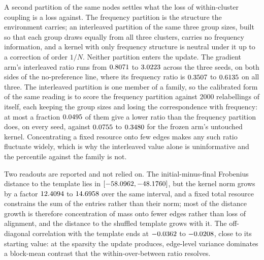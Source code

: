 \documentclass{article}
\begin{document}
A second partition of the same nodes settles what the loss of within-cluster
coupling is a loss against. The frequency partition is the structure the
environment carries; an interleaved partition of the same three group sizes,
built so that each group draws equally from all three clusters, carries no
frequency information, and a kernel with only frequency structure is neutral
under it up to a correction of order $1/N$. Neither partition enters the update.
The gradient arm's interleaved ratio runs from $0.8071$ to
$3.0223$ across the three seeds, on both sides of the
no-preference line, where its frequency ratio is $0.3507$ to
$0.6135$ on all three. The interleaved partition is one member of
a family, so the calibrated form of the same reading is to score the frequency
partition against $2000$ relabellings of itself, each keeping the group sizes
and losing the correspondence with frequency: at most a fraction
$0.0495$ of them give a lower ratio than the frequency
partition does, on every seed, against $0.0755$ to
$0.3480$ for the frozen arm's untouched kernel.
Concentrating a fixed resource onto few edges makes any such ratio fluctuate
widely, which is why the interleaved value alone is uninformative and the
percentile against the family is not.

Two readouts are reported and not relied on. The initial-minus-final Frobenius
distance to the template lies in
$[-58.0962,-48.1760]$, but the kernel norm grows
by a factor $12.4094$ to $14.6958$ over the
same interval, and a fixed total resource constrains the sum of the entries
rather than their norm; most of the distance growth is therefore concentration
of mass onto fewer edges rather than loss of alignment, and the distance to the
shuffled template grows with it. The off-diagonal correlation with the template
ends at $-0.0362$ to $-0.0208$, close to its
starting value: at the sparsity the update produces, edge-level variance
dominates a block-mean contrast that the within-over-between ratio resolves.
\end{document}
